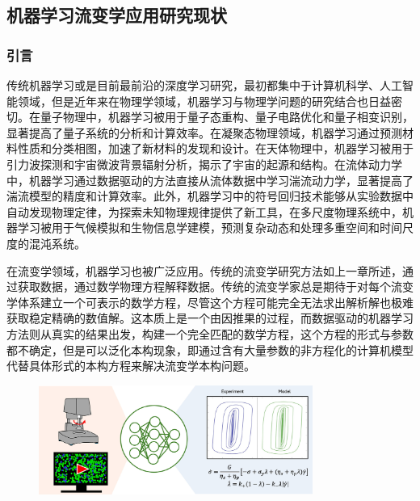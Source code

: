 \subsection{机器学习流变学应用研究现状}
\subsubsection{引言}
传统机器学习或是目前最前沿的深度学习研究，最初都集中于计算机科学、人工智能领域，但是近年来在物理学领域，机器学习与物理学问题的研究结合也日益密切\cite{choudhary2022recent}。在量子物理中，机器学习被用于量子态重构、量子电路优化和量子相变识别，显著提高了量子系统的分析和计算效率\cite{biamonte2017quantum}。在凝聚态物理领域，机器学习通过预测材料性质和分类相图，加速了新材料的发现和设计\cite{choudhary2022recent}。在天体物理中，机器学习被用于引力波探测和宇宙微波背景辐射分析，揭示了宇宙的起源和结构\cite{bufano2023machine}。在流体动力学中，机器学习通过数据驱动的方法直接从流体数据中学习湍流动力学，显著提高了湍流模型的精度和计算效率\cite{bruntonMachineLearningFluid2020}。此外，机器学习中的符号回归技术能够从实验数据中自动发现物理定律，为探索未知物理规律提供了新工具\cite{udrescuAIFeynmanPhysicsinspired2020}，在多尺度物理系统中，机器学习被用于气候模拟和生物信息学建模，预测复杂动态和处理多重空间和时间尺度的混沌系统。

在流变学领域，机器学习也被广泛应用。传统的流变学研究方法如上一章所述，通过获取数据，通过数学物理方程解释数据。传统的流变学家总是期待于对每个流变学体系建立一个可表示的数学方程，尽管这个方程可能完全无法求出解析解也极难获取稳定精确的数值解。这本质上是一个由因推果的过程，而数据驱动的机器学习方法则从真实的结果出发，构建一个完全匹配的数学方程，这个方程的形式与参数都不确定，但是可以泛化本构现象，即通过含有大量参数的非方程化的计算机模型代替具体形式的本构方程来解决流变学本构问题\cite{colenMachineLearningActivenematic2021,bahiuddinReviewModelingSchemes2024,mangalDatadrivenTechniquesRheology2025}。
\begin{figure}[htbp]
	\centering
	\includegraphics[width=0.8\textwidth]{Fig/datadrivenintro.jpg}
\end{figure}


